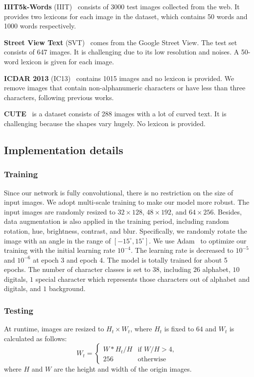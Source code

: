 \documentclass[letterpaper]{article} \usepackage{aaai19}  \usepackage{times}  \usepackage{helvet}  \usepackage{courier}  \usepackage{url}  \usepackage{graphicx}  \frenchspacing  \usepackage{multirow}
\begin{document}
\textbf{IIIT5k-Words} (IIIT)~\cite{DBLP:conf/cvpr/MishraAJ12} consists of 3000 test images collected from the web. It provides two lexicons for each image in the dataset, which contains 50 words and 1000 words respectively.

\textbf{Street View Text} (SVT)~\cite{DBLP:conf/iccv/WangBB11} comes from the Google Street View. The test set consists of 647 images. It is challenging due to its low resolution and noises. A 50-word lexicon is given for each image.

\textbf{ICDAR 2013} (IC13)~\cite{karatzas2013icdar} contains 1015 images and no lexicon is provided. We remove images that contain non-alphanumeric characters or have less than three characters, following previous works.

\textbf{CUTE}~\cite{cute} is a dataset consists of 288 images with a lot of curved text. It is challenging because the shapes vary hugely. No lexicon is provided.

\subsection{Implementation details}
\subsubsection{Training}
Since our network is fully convolutional, there is no restriction on the size of input images. We adopt multi-scale training to make our model more robust. The input images are randomly resized to $32 \times 128$, $48 \times 192$, and $64 \times 256$. Besides, data augmentation is also applied in the training period, including random rotation, hue, brightness, contrast, and blur. Specifically, we randomly rotate the image with an angle in the range of $[-15^\circ, 15^\circ]$.
We use Adam~\cite{adam} to optimize our training with the initial learning rate $10^{-4}$. The learning rate is decreased to $10^{-5}$ and $10^{-6}$ at epoch 3 and epoch 4. The model is totally trained for about 5 epochs. The number of character classes is set to $38$, including $26$ alphabet, $10$ digitals, $1$ special character which represents those characters out of alphabet and digitals, and $1$ background. 

\subsubsection{Testing}
At runtime, images are resized to $H_t \times W_t$, where $H_t$ is fixed to $64$ and $W_t$ is calculated as follows:
\begin{equation}
  W_t = 
  \begin{cases}
    W*H_t/H& \text{if } W/H>4, \\
    256& \text{otherwise}
  \end{cases}
\end{equation}
where $H$ and $W$ are the height and width of the origin images. 
\end{document}
